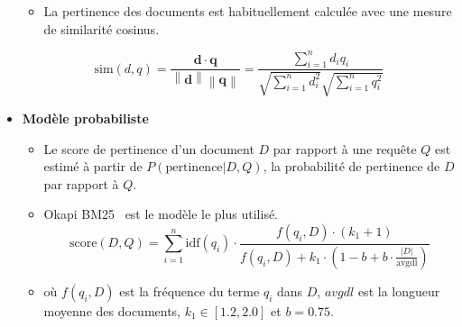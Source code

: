 \documentclass[11pt,aspectratio=43,dvipsnames,table]{beamer}
\begin{document}
\begin{frame}[allowframebreaks]
\begin{itemize}
\begin{itemize}
            \framebreak

            \item La pertinence des documents est habituellement calculée avec 
                  une mesure de similarité cosinus.
        \end{itemize}
        \begin{equation*}
          \text{sim}(d,q) = \frac{ \mathbf{d} \cdot \mathbf{q} }
                                   { \left\|\mathbf{d}\right\| \left\|\mathbf{q}\right\| }
                          = \frac{ \sum _{i=1}^n d_i q_i }
                                   { \sqrt{\sum_{i=1}^n d_i^2}
                                     \sqrt{\sum _{i=1}^n q_i^2} }
        \end{equation*}

        \framebreak

        \item \textbf{Modèle probabiliste}~\cite{robertson1976relevance}
         \begin{itemize}
            \item Le score de pertinence d'un document $D$ par rapport à une 
                  requête $Q$ est estimé à partir de $P(\text{pertinence}|D,Q)$,
                  la probabilité de pertinence de $D$ par rapport à $Q$.
            \item Okapi BM25~\cite{DBLP:conf/trec/RobertsonWHGL92} est le modèle 
                  le plus utilisé.
            \begin{equation*}
              \text{score}(D,Q) = \sum_{i=1}^{n} \text{idf}(q_i) \cdot 
              \frac{f(q_i, D) \cdot (k_1 + 1)}
              {f(q_i, D) + k_1 \cdot (1 - b + b \cdot \frac{|D|}{\text{avgdl}})}
            \end{equation*}
            \item où $f(q_i, D)$ est la fréquence du terme $q_i$ dans $D$, 
                  $avgdl$ est la longueur moyenne des documents, 
                  $k_1 \in [1.2,2.0]$ et $b = 0.75$.
        \end{itemize}

        \framebreak


\end{itemize}
\end{frame}
\end{document}
